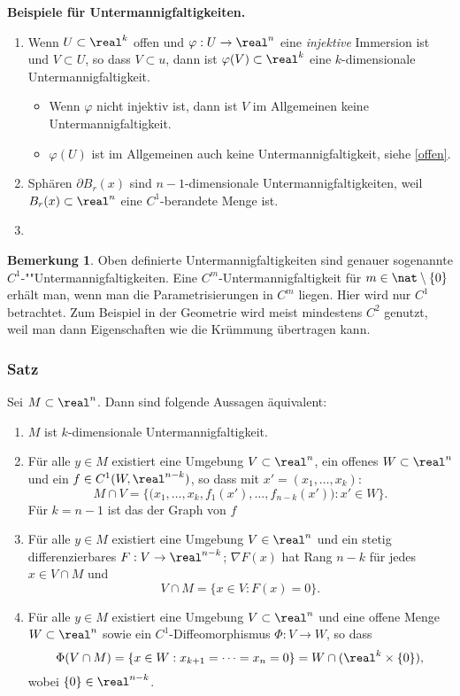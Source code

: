 \documentclass[
 a4paper,
 12pt,
 parskip=half
 ]{scrartcl}
\theoremstyle{plain}
\theoremstyle{definition}
\newtheorem*{rmrk}{Bemerkung}
\numberwithin{equation}{section}
\begin{document}
\textbf{Beispiele für Untermannigfaltigkeiten.}
\begin{enumerate}
 \item Wenn $U \subset \real^k$ offen und $\varphi: U \to \real^n$ eine \emph{injektive} Immersion ist und $V \subset U$, so dass $V \subset u$, dann ist $\varphi(V) \subset \real^k$ eine $k$-dimensionale Untermannigfaltigkeit.
 \begin{itemize}
  \item Wenn $\varphi$ nicht injektiv ist, dann ist $V$ im Allgemeinen keine Untermannigfaltigkeit.
  \item $\varphi(U)$ ist im Allgemeinen auch keine Untermannigfaltigkeit, siehe \ref{offen}.
 \end{itemize}
 \item Sphären $\partial B_r(x)$ sind $n-1$-dimensionale Untermannigfaltigkeiten, weil $B_r(x) \subset \real^n$ eine $C^1$-berandete Menge ist.
 \item 
\end{enumerate}

\begin{rmrk}
 Oben definierte Untermannigfaltigkeiten sind genauer sogenannte $C^1$-""Untermannigfaltigkeiten. Eine $C^m$-Untermannigfaltigkeit für $m \in \nat \setminus \{0\}$ erhält man, wenn man die Parametrisierungen in $C^m$ liegen. Hier wird nur $C^1$ betrachtet. Zum Beispiel in der Geometrie wird meist mindestens $C^2$ genutzt, weil man dann Eigenschaften wie die Krümmung übertragen kann.
\end{rmrk}

\newpage

\subsubsection{Satz}
\begin{thm}
 Sei $M \subset \real^n$. Dann sind folgende Aussagen äquivalent:
 \begin{enumerate}
  \item $M$ ist $k$-dimensionale Untermannigfaltigkeit.
  \item Für alle $y \in M$ existiert eine Umgebung $V \subset \real^n$, ein offenes $W \subset \real^n$ und ein $f \in C^1(W, \real^{n-k})$, so dass mit $x' = (x_1, \ldots, x_k)$:
  \[ M \cap V = \{ \big(x_1, \ldots, x_k, f_1(x'), \ldots, f_{n-k}(x') \big) : x' \in W \}. \]
  Für $k = n-1$ ist das der Graph von $f$
  \item Für alle $y \in M$ existiert eine Umgebung $V \in \real^n$ und ein stetig differenzierbares $F:V \to \real^{n-k}$; $\nabla F(x)$ hat Rang $n-k$ für jedes $x \in V \cap M$ und
  \[ V \cap M = \{ x \in V : F(x) = 0 \}. \]
  \item Für alle $y \in M$ existiert eine Umgebung $V \subset \real^n$ und eine offene Menge $W \subset \real^n$ sowie ein $C^1$-Diffeomorphismus $\Phi: V \to W$, so dass
  \[ \Phi(V \cap M) = \{ x \in W : x_{k+1} = \cdots = x_n = 0 \} = W \cap (\real^k \times \{ 0 \}), \]
  wobei $\{ 0 \} \in \real^{n-k}$.
 \end{enumerate}
\end{thm}
\end{document}
